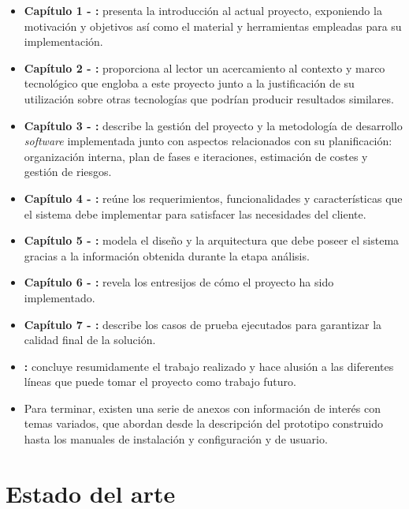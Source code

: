 \documentclass[12pt,a4paper, twoside]{report}
\begin{document}
	\begin{itemize}
		\item \textbf{Capítulo 1 - :} presenta la introducción al actual proyecto, exponiendo la motivación y objetivos así como el material y herramientas empleadas para su implementación.		
		\item \textbf{Capítulo 2 - :} proporciona al lector un acercamiento al contexto y marco tecnológico que engloba a este proyecto junto a la justificación de su utilización sobre otras tecnologías que podrían producir resultados similares.		
		\item \textbf{Capítulo 3 - :} describe la gestión del proyecto y la metodología de desarrollo \textit{software} implementada junto con aspectos relacionados con su planificación: organización interna, plan de fases e iteraciones, estimación de costes y gestión de riesgos.		
		\item \textbf{Capítulo 4 - :} reúne los requerimientos, funcionalidades y características que el sistema debe implementar para satisfacer las necesidades del cliente.
		\item \textbf{Capítulo 5 - :} modela el diseño y la arquitectura que debe poseer el sistema gracias a la información obtenida durante la etapa análisis. 
		\item \textbf{Capítulo 6 - :} revela los entresijos de cómo el proyecto ha sido implementado.
		\item \textbf{Capítulo 7 - :} describe los casos de prueba ejecutados para garantizar la calidad final de la solución.
		\item \textbf{:} concluye resumidamente el trabajo realizado y hace alusión a las diferentes líneas que puede tomar el proyecto como trabajo futuro.	 
		\item Para terminar, existen una serie de anexos con información de interés con temas variados, que abordan desde la descripción del \gls{prototipo} construido hasta los manuales de instalación y configuración y de usuario.
	\end{itemize}
	
	\chapter{Estado del arte} \label{stateArtChapter}
	
\end{document}
